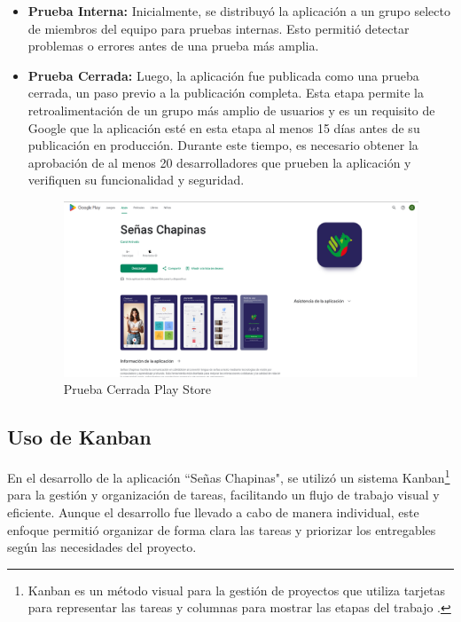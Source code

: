 \begin{itemize}
    \item \textbf{Prueba Interna:} Inicialmente, se distribuyó la aplicación a un grupo selecto de miembros del equipo para pruebas internas. Esto permitió detectar problemas o errores antes de una prueba más amplia.
    \item \textbf{Prueba Cerrada:} Luego, la aplicación fue publicada como una prueba cerrada, un paso previo a la publicación completa. Esta etapa permite la retroalimentación de un grupo más amplio de usuarios y es un requisito de Google que la aplicación esté en esta etapa al menos 15 días antes de su publicación en producción. Durante este tiempo, es necesario obtener la aprobación de al menos 20 desarrolladores que prueben la aplicación y verifiquen su funcionalidad y seguridad.

    \begin{figure} [H]
        \centering
        \includegraphics[width=1\linewidth]{figuras/prueba_cerrada.png}
        \caption{Prueba Cerrada Play Store}
        \label{fig:enter-label}
    \end{figure}
\end{itemize}




\subsection{Uso de Kanban}

En el desarrollo de la aplicación ``Señas Chapinas", se utilizó un sistema Kanban\footnote{Kanban es un método visual para la gestión de proyectos que utiliza tarjetas para representar las tareas y columnas para mostrar las etapas del trabajo \cite{asana2024}.} para la gestión y organización de tareas, facilitando un flujo de trabajo visual y eficiente. Aunque el desarrollo fue llevado a cabo de manera individual, este enfoque permitió organizar de forma clara las tareas y priorizar los entregables según las necesidades del proyecto.


